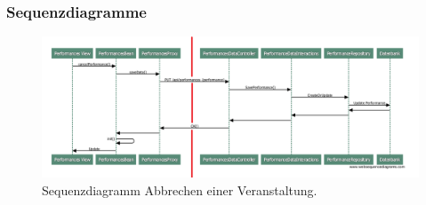 \documentclass[a4paper,ngerman]{scrartcl}
\begin{document}
\subsubsection{Sequenzdiagramme}
\begin{figure}[h]
\centering
\includegraphics[width=.85\textwidth]{sequence_diagrams/performance_cancel}
\caption{Sequenzdiagramm Abbrechen einer Veranstaltung.}
\label{fig:beans}
\end{figure}
\end{document}
